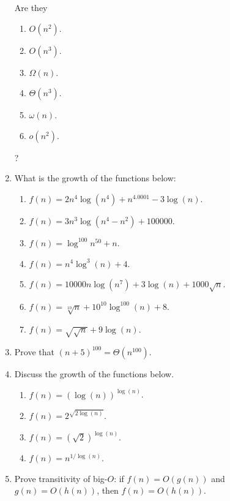 \documentclass[9pt]{article}
\begin{document}
\begin{enumerate}
         Are they
         \begin{enumerate}
            \item $O(n^2)$.
            \item $O(n^3)$.
            \item $\Omega(n)$.
            \item $\Theta(n^3)$.
            \item $\omega(n)$.
            \item $o(n^2)$.
         \end{enumerate}
         ?
   \item What is the growth of the functions below:
         \begin{enumerate}
            \item $f(n) = 2n^4\log(n^4) + n^{4.0001}-3\log(n)$.
            \item $f(n) = 3n^3\log(n^4-n^2)+100000$.
            \item $f(n) = \log^{100}n^{50} + n$.
            \item $f(n) = n^4\log^3(n)+4$.
            \item $f(n) = 10000n\log(n^7)+3\log(n)+1000\sqrt{n}$.
            \item $f(n) = \sqrt[10]{n}+10^{10}\log^{100}(n)+8$.
            \item $f(n) = \sqrt{\sqrt{n}}+9\log(n)$.
         \end{enumerate}
   \item Prove that $(n+5)^{100} = \Theta(n^{100})$.
   \item Discuss the growth of the functions below.
         \begin{enumerate}
            \item $f(n) = (\log(n))^{\log(n)}$.
            \item $f(n) = 2^{\sqrt{2\log(n)}}$.
            \item $f(n) = (\sqrt{2})^{\log(n)}$.
            \item $f(n) = n^{1/\log(n)}$.
         \end{enumerate}
   \item Prove transitivity of big-$O$: if $f(n) = O(g(n))$ and
         $g(n) = O(h(n))$, then $f(n) = O(h(n))$.


\end{enumerate}
\end{document}

